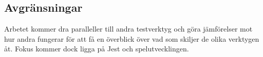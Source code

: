 \subsection{Avgränsningar}
Arbetet kommer dra paralleller till andra testverktyg och göra jämförelser mot hur andra fungerar för att få en överblick över vad som skiljer de olika verktygen åt. Fokus kommer dock ligga på Jest och spelutvecklingen.




